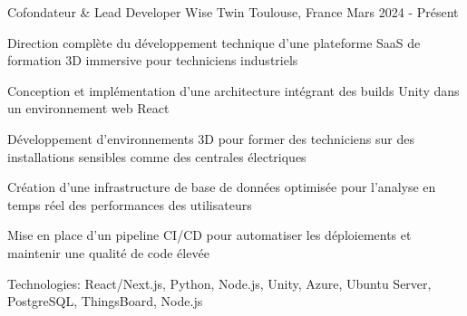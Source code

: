 


\begin{cventries}


\cventry
{Cofondateur \& Lead Developer} %
{Wise Twin} %
{Toulouse, France} %
{Mars 2024 - Présent} %
{ %
\begin{cvitems}
\item {Direction complète du développement technique d'une plateforme SaaS de formation 3D immersive pour techniciens industriels}
\item {Conception et implémentation d'une architecture intégrant des builds Unity dans un environnement web React}
\item {Développement d'environnements 3D pour former des techniciens sur des installations sensibles comme des centrales électriques}
\item {Création d'une infrastructure de base de données optimisée pour l'analyse en temps réel des performances des utilisateurs}
\item {Mise en place d'un pipeline CI/CD pour automatiser les déploiements et maintenir une qualité de code élevée}
\item {Technologies: React/Next.js, Python, Node.js, Unity, Azure, Ubuntu Server, PostgreSQL, ThingsBoard, Node.js}
\end{cvitems}
}
\vspace{1.5em}



\end{cventries}
